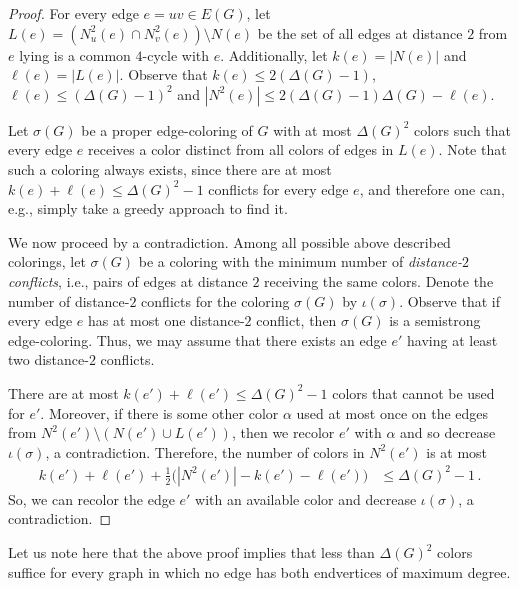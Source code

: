 \documentclass[12pt,a4paper]{article}
\begin{document}
\begin{proof}
	For every edge $e = uv \in E(G)$, 
	let $L(e) = (N_u^2(e) \cap N_v^2(e))\setminus N(e)$ be the set of all edges at distance $2$ from $e$ lying is a common $4$-cycle with $e$.
	Additionally, let $k(e) = |N(e)|$ and $\ell(e) = |L(e)|$.
	Observe that $k(e) \le 2(\Delta(G) - 1)$, $\ell(e) \le (\Delta(G) - 1)^2$ 
	and $|N^2(e)| \le 2(\Delta(G)-1)\Delta(G) - \ell(e)$.

	Let $\sigma(G)$ be a proper edge-coloring of $G$ with at most $\Delta(G)^2$ colors 
	such that every edge $e$ receives a color distinct from all colors of edges in $L(e)$.
	Note that such a coloring always exists, since there are at most 
	$k(e) + \ell(e) \le \Delta(G)^2 - 1$ 
	conflicts for every edge $e$,
	and therefore one can, e.g., simply take a greedy approach to find it.

	We now proceed by a contradiction. 
	Among all possible above described colorings, let $\sigma(G)$ be a coloring with the minimum number of {\em distance-$2$ conflicts},
	i.e., pairs of edges at distance $2$ receiving the same colors.
	Denote the number of distance-$2$ conflicts for the coloring $\sigma(G)$ by $\iota(\sigma)$.
	Observe that if every edge $e$ has at most one distance-$2$ conflict, then $\sigma(G)$ is a semistrong edge-coloring.
	Thus, we may assume that there exists an edge $e'$ having at least two distance-$2$ conflicts.

	There are at most $k(e') + \ell(e') \le \Delta(G)^2 - 1$ colors that cannot be used for $e'$.
	Moreover, if there is some other color $\alpha$ used at most once on the edges from $N^2(e') \setminus (N(e') \cup L(e'))$, 
	then we recolor $e'$ with $\alpha$ and so decrease $\iota(\sigma)$, a contradiction.
	Therefore, the number of colors in $N^2(e')$ is at most
	\begin{align*}
		k(e') + \ell(e') + \frac{1}{2}\Big(|N^2(e')| - k(e') - \ell(e')\Big) &\le \Delta(G)^2 - 1\,.
	\end{align*}
	So, we can recolor the edge $e'$ with an available color and decrease $\iota(\sigma)$, a contradiction.
\end{proof}

Let us note here that the above proof implies that less than $\Delta(G)^2$ colors 
suffice for every graph in which no edge has both endvertices of maximum degree.



\end{document}
